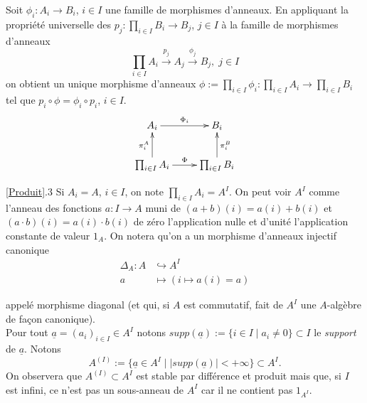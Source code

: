 \documentclass[a4paper, oneside, 12pt]{book}
\theoremstyle{definition} %
\begin{document}
   Soit $\phi_i:A_i\rightarrow B_i$, $i\in I$ une famille de morphismes d'anneaux. En appliquant la propriété universelle des $p_j:\prod_{i\in I}B_i\rightarrow B_j$, $j\in I$ à la famille de morphismes d'anneaux
$$ \prod_{i\in I}A_i\stackrel{p_j}{\rightarrow}A_j\stackrel{\phi_j}{\rightarrow} B_j,\; j\in I$$
on obtient un unique morphisme d'anneaux $\phi:=\prod_{i\in I}\phi_i:\prod_{i\in I}A_i\rightarrow \prod_{i\in I} B_i$ tel que $p_i\circ \phi=\phi_i\circ p_i$, $i\in I$. \\

	$$ \xymatrix{ A_i \ar[r]^{\Phi_i} & B_i \\ \prod_{i\in I} A_i \ar[u]^{\pi^A_i} \ar[r]^\Phi & \prod_{i\in I}B_i \ar[u]_{\pi^B_i} } $$

\ref{Produit}.3 Si $A_i=A$, $i\in I$, on note $\prod_{i\in I}A_i=A^I$. On peut  voir $A^I$ comme l'anneau des fonctions $a:I\rightarrow A$ muni de $(a+b)(i)=a(i)+b(i)$  et $(a\cdot b)(i)=a(i)\cdot b(i)$  de zéro l'application nulle et d'unité l'application constante de valeur $1_A$. On notera qu'on a un morphisme d'anneaux injectif canonique
	\begin{align*}
		\Delta_A : A &\hookrightarrow A^I \\
		a &\mapsto (i\mapsto a(i)=a)
	\end{align*}

	appelé morphisme diagonal (et qui, si $A$ est commutatif,   fait de $A^I$  une $A$-algèbre de fa\c{c}on canonique).\\

  Pour tout $\underline{a}=(a_i)_{i\in I}\in A^I$ notons $supp(\underline{a}):=\lbrace i\in I\; |\; a_i\not= 0\rbrace\subset I$ le \textit{support} de $\underline{a}$. Notons $$A^{(I)}:=\lbrace \underline{a}\in A^I\; |\; |supp(\underline{a})|<+\infty\rbrace \subset A^I.$$
On observera que $A^{(I)}\subset A^I$ est stable par différence et produit mais que, si $I$ est infini, ce n'est pas un sous-anneau de $A^I$ car il ne contient pas $1_{A^I}$. 
\end{document}
